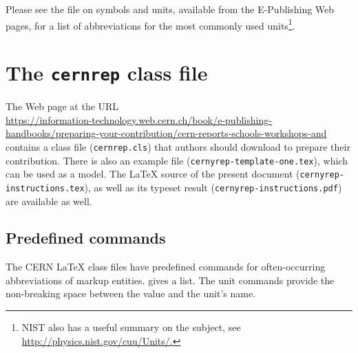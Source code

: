 \documentclass{cernrep}
\begin{document}
Please see the file on symbols and units, available from the E-Publishing Web
pages, for a list of abbreviations for the most commonly used
units\footnote{NIST also has a useful summary on the subject, see
\url{http://physics.nist.gov/cuu/Units/.}}.

\newpage
\appendix

\section{The \texttt{cernrep} class file}

The Web page at the URL\\
\url{https://information-technology.web.cern.ch/book/e-publishing-handbooks/preparing-your-contribution/cern-reports-schools-workshops-and}
contains a class file (\texttt{cernrep.cls}) that authors should
download to prepare their contribution. There is also an example file
(\texttt{cernyrep-template-one.tex}), which can be used as a model. The \LaTeX{}
source of the present document (\texttt{cernyrep-instructions.tex}), as well as its
typeset result (\texttt{cernyrep-instructions.pdf}) are available as well.

\subsection{Predefined commands}

The CERN \LaTeX{} class files have predefined commands for
often-occurring abbreviations of markup entities. 
gives a list. The unit commands provide the non-breaking space between
the value and the unit's name.
\end{document}
